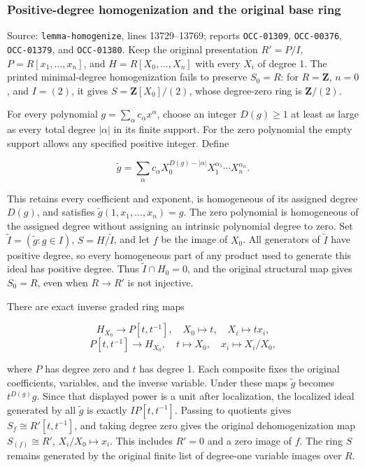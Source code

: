 \subsubsection{Positive-degree homogenization and the original base ring}\label{algebra-proof-002-positive-degree-homogenization-and-the-original-base-ring}

Source: \texttt{lemma-homogenize}, lines 13729--13769; reports \texttt{OCC-01309}, \texttt{OCC-00376}, \texttt{OCC-01379}, and \texttt{OCC-01380}. Keep the original presentation \(R'=P/I\), \(P=R[x_1,\ldots,x_n]\), and \(H=R[X_0,\ldots,X_n]\) with every \(X_i\) of degree 1. The printed minimal-degree homogenization fails to preserve \(S_0=R\): for \(R=\mathbf Z\), \(n=0\), and \(I=(2)\), it gives \(S=\mathbf Z[X_0]/(2)\), whose degree-zero ring is \(\mathbf Z/(2)\).

For every polynomial \(g=\sum_\alpha c_\alpha x^\alpha\), choose an integer \(D(g)\geq1\) at least as large as every total degree \(|\alpha|\) in its finite support. For the zero polynomial the empty support allows any specified positive integer. Define

\[
\widetilde g=\sum_\alpha c_\alpha
 X_0^{D(g)-|\alpha|}X_1^{\alpha_1}\cdots X_n^{\alpha_n}.
\]

This retains every coefficient and exponent, is homogeneous of its assigned degree \(D(g)\), and satisfies \(\widetilde g(1,x_1,\ldots,x_n)=g\). The zero polynomial is homogeneous of the assigned degree without assigning an intrinsic polynomial degree to zero. Set \(\widetilde I=(\widetilde g:g\in I)\), \(S=H/\widetilde I\), and let \(f\) be the image of \(X_0\). All generators of \(\widetilde I\) have positive degree, so every homogeneous part of any product used to generate this ideal has positive degree. Thus \(\widetilde I\cap H_0=0\), and the original structural map gives \(S_0=R\), even when \(R\to R'\) is not injective.

There are exact inverse graded ring maps

\[
H_{X_0}\longrightarrow P[t,t^{-1}],\quad X_0\mapsto t,\quad X_i\mapsto t x_i,
\] \[
P[t,t^{-1}]\longrightarrow H_{X_0},\quad t\mapsto X_0,\quad x_i\mapsto X_i/X_0,
\]

where \(P\) has degree zero and \(t\) has degree 1. Each composite fixes the original coefficients, variables, and the inverse variable. Under these maps \(\widetilde g\) becomes \(t^{D(g)}g\). Since that displayed power is a unit after localization, the localized ideal generated by all \(\widetilde g\) is exactly \(I P[t,t^{-1}]\). Passing to quotients gives \(S_f\cong R'[t,t^{-1}]\), and taking degree zero gives the original dehomogenization map \(S_{(f)}\cong R'\), \(X_i/X_0\mapsto x_i\). This includes \(R'=0\) and a zero image of \(f\). The ring \(S\) remains generated by the original finite list of degree-one variable images over \(R\).

